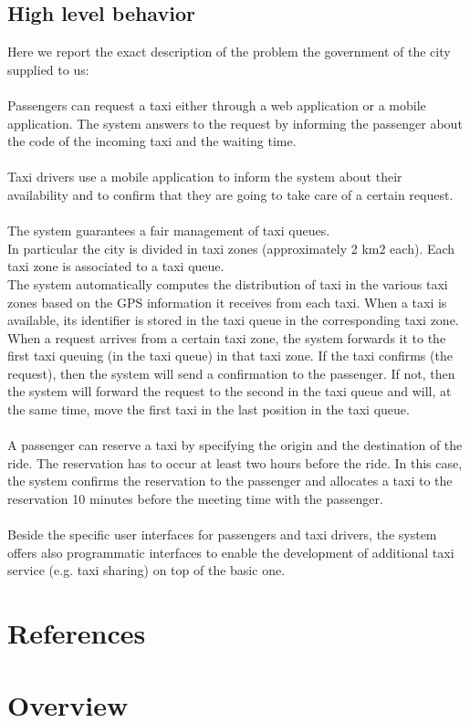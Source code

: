 \subsection{High level behavior}
Here we report the exact description of the problem the government of the city supplied to us: \\ \\ 
Passengers can request a taxi either through a web application or a mobile application.
The system answers to the request by informing the passenger about the code of the incoming taxi and the waiting time.\\ \\
Taxi drivers use a mobile application to inform the system about their availability and to confirm that they are going to take care of a certain request. \\ \\  
The system guarantees a fair management of taxi queues. \\
In particular the city is divided in taxi zones (approximately 2 km2 each). Each taxi zone is associated to a taxi queue.\\
The system automatically computes the distribution of taxi in the various taxi zones based on the GPS information it receives from each taxi. When a taxi is available, its identifier is stored in the taxi queue in the corresponding taxi zone. When a request arrives from a certain taxi zone, the system forwards it to the first taxi queuing (in the taxi queue) in that taxi zone. If the taxi confirms (the request), then the system will send a confirmation to the passenger. If not, then the system will forward the request to the second in the taxi queue and will, at the same time, move the first taxi in the last position in the taxi queue.\\ \\
A passenger can reserve a taxi by specifying the origin and the destination of the ride. The reservation has to occur at least two hours before the ride. In this case, the system confirms the reservation to the passenger and allocates a taxi to the reservation 10 minutes before the meeting time with the passenger. \\ \\
Beside the specific user interfaces for passengers and taxi drivers, the system offers also programmatic interfaces to enable the development of additional taxi service (e.g. taxi sharing) on top of the basic one. 



\section{References}

\section{Overview}
